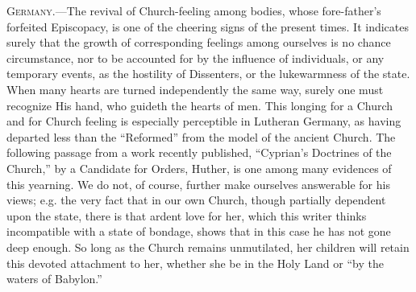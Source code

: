 G\textsc{ermany}.—The revival of
Church-feeling among bodies, whose fore-father's forfeited Episcopacy,
is one of the cheering signs of the present times. It indicates surely
that the growth of corresponding feelings among ourselves is no chance
circumstance, nor to be accounted for by the influence of individuals,
or any temporary events, as the hostility of Dissenters, or the
lukewarmness of the state. When many hearts are turned independently the
same way, surely one must recognize His hand, who guideth the hearts of
men. This longing for a Church and for Church feeling is especially
perceptible in Lutheran Germany, as having departed less than the ``Reformed''
from the model of the ancient Church. The following passage from a work
recently published, ``Cyprian's Doctrines of the Church,'' by a Candidate
for Orders, Huther, is one among many evidences of this yearning. We do
not, of course, further make ourselves answerable for his views; e.g.
the very fact that in our own Church, though partially dependent upon
the state, there is that ardent love for her, which this writer thinks
incompatible with a state of bondage, shows that in this case he has not
gone deep enough. So long as the Church remains unmutilated, her
children will retain this devoted attachment to her, whether she be in
the Holy Land or ``by the waters of Babylon.''

